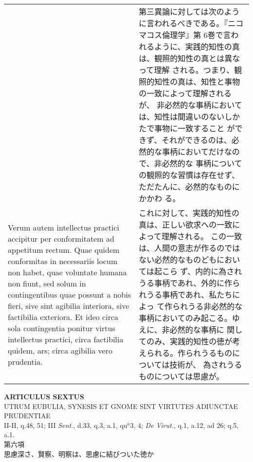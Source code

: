 \documentclass[10pt]{jsarticle}
\begin{document}
\begin{longtable}{p{21em}p{21em}}
&

第三異論に対しては次のように言われるべきである。『ニコマコス倫理学』第
6巻で言われるように、実践的知性の真は、観照的知性の真とは異なって理解
される。つまり、観照的知性の真は、知性と事物の一致によって理解されるが、
非必然的な事柄においては、知性は間違いのないしかたで事物に一致すること
ができず、それができるのは、必然的な事柄においてだけなので、非必然的な
事柄についての観照的な習慣は存在せず、ただたんに、必然的なものにかかわ
る。

\\

Verum autem intellectus practici accipitur per conformitatem ad
appetitum rectum. Quae quidem conformitas in necessariis locum non
habet, quae voluntate humana non fiunt, sed solum in contingentibus
quae possunt a nobis fieri, sive sint agibilia interiora, sive
factibilia exteriora. Et ideo circa sola contingentia ponitur virtus
intellectus practici, circa factibilia quidem, ars; circa agibilia
vero prudentia.

&

これに対して、実践的知性の真は、正しい欲求への一致によって理解される。
この一致は、人間の意志が作るのではない必然的なものどもにおいては起こら
ず、内的に為されうる事柄であれ、外的に作られうる事柄であれ、私たちによっ
て作られうる非必然的な事柄においてのみ起こる。ゆえに、非必然的な事柄に
関してのみ、実践的知性の徳が考えられる。作られうるものについては技術が、
為されうるものについては思慮が。

\end{longtable}
\newpage

\begin{center}
 {\Large {\bf ARTICULUS SEXTUS}}\\ {\large UTRUM EUBULIA, SYNESIS ET
 GNOME SINT VIRTUTES ADIUNCTAE PRUDENTIAE}\\ {\footnotesize II-II,
 q.48, 51; III {\itshape Sent.}, d.33, q.3, a.1, qu$^{a}$3, 4;
 {\itshape De Virut.}, q.1, a.12, ad 26; q.5, a.1.}\\ {\Large 第六項\\
 思慮深さ、賢察、明察は、思慮に結びついた徳か}
\end{center}
\end{document}
